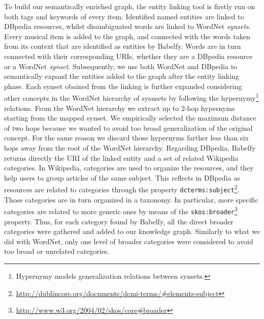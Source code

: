 To build our semantically enriched graph, the entity linking tool is firstly run on both tags and keywords of every item. Identified named entities are linked to DBpedia resources, whilst disambiguated words are linked to WordNet \textit{synsets}. Every musical item is added to the graph, and connected with the words taken from its context that are identified as entities by Babelfy. Words are in turn connected with their corresponding URIs, whether they are a DBpedia resource or a WordNet \textit{synset}.
Subsequently, we use both WordNet and DBpedia to semantically expand the entities added to the graph after the entity linking phase. 
Each synset obained from the linking is further expanded considering other concepts in the WordNet hierarchy of sysnsets by following the hypernymy\footnote{Hypernymy models generalization relations between synsets.} relations. 
From the WordNet hierarchy we extract up to 2-hop hypernyms starting from the mapped synset. We empirically selected the maximum distance of two hops because we wanted to avoid too broad generalization of the original concept. For the same reason we discard those hypernyms farther less than six hops away from the root of the WordNet hierarchy. %
Regarding DBpedia, Babelfy returns directly the URI of the linked entity and a set of related Wikipedia categories. In Wikipedia, categories are used to organize the resources, and they help users to group articles of the same subject. This reflects in DBpedia as resources are related to categories through the property \texttt{dcterms:subject}\footnote{\url{http://dublincore.org/documents/dcmi-terms/\#elements-subject}}. Those categories are in turn organized in a taxonomy. In particular, more specific categories are related to more generic ones by means of the \texttt{skos:broader}\footnote{\url{http://www.w3.org/2004/02/skos/core\#broader}} property. Thus, for each category found by Babelfy, all the direct broader categories were gathered and added to our knowledge graph. Similarly to what we did with WordNet, only one level of broader categories were considered to avoid too broad or unrelated categories.

